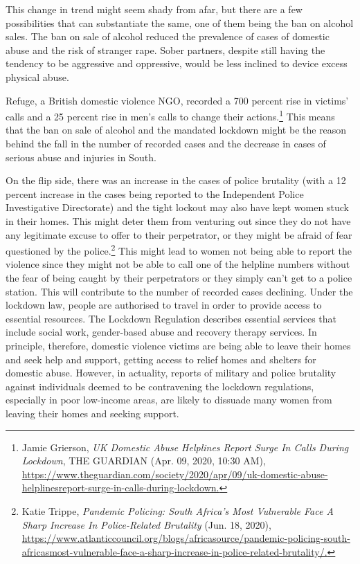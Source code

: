 \begin{multicols}{2}
\noi
This change in trend might seem shady from afar, but there are a few possibilities that can
substantiate the same, one of them being the ban on alcohol sales. The ban on sale of alcohol
reduced the prevalence of cases of domestic abuse and the risk of stranger rape. Sober
partners, despite still having the tendency to be aggressive and oppressive, would be less
inclined to device excess physical abuse.

\noi
Refuge, a British domestic violence NGO, recorded a 700 percent rise in victims' calls and a
25 percent rise in men's calls to change their actions.\footnote{Jamie Grierson, \textit{UK Domestic Abuse Helplines Report Surge In Calls During Lockdown}, THE GUARDIAN
(Apr. 09, 2020, 10:30 AM), \url{https://www.theguardian.com/society/2020/apr/09/uk-domestic-abuse-helplinesreport-surge-in-calls-during-lockdown.}} This means that the ban on sale of
alcohol and the mandated lockdown might be the reason behind the fall in the number of
recorded cases and the decrease in cases of serious abuse and injuries in South. 

\noi
On the flip side, there was an increase in the cases of police brutality (with a 12 percent
increase in the cases being reported to the Independent Police Investigative Directorate) and
the tight lockout may also have kept women stuck in their homes. This might deter them from
venturing out since they do not have any legitimate excuse to offer to their perpetrator, or
they might be afraid of fear questioned by the police.\footnote{Katie Trippe, \textit{Pandemic Policing: South Africa’s Most Vulnerable Face A Sharp Increase In Police-Related
Brutality} (Jun. 18, 2020), \url{https://www.atlanticcouncil.org/blogs/africasource/pandemic-policing-south-africasmost-vulnerable-face-a-sharp-increase-in-police-related-brutality/.}} This might lead to women not being
able to report the violence since they might not be able to call one of the helpline numbers
without the fear of being caught by their perpetrators or they simply can't get to a police
station. This will contribute to the number of recorded cases declining. Under the lockdown
law, people are authorised to travel in order to provide access to essential resources. The
Lockdown Regulation describes essential services that include social work, gender-based
abuse and recovery therapy services. In principle, therefore, domestic violence victims are
being able to leave their homes and seek help and support, getting access to relief homes and
shelters for domestic abuse. However, in actuality, reports of military and police brutality
against individuals deemed to be contravening the lockdown regulations, especially in poor
low-income areas, are likely to dissuade many women from leaving their homes and seeking
support.


\end{multicols}
